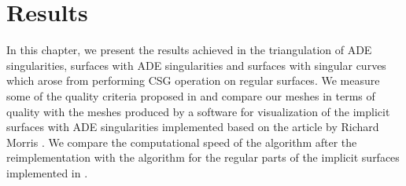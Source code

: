 \newcommand*{\MinNumberC}{0.5}%
\newcommand*{\MidNumberC}{0.75}%
\newcommand*{\MaxNumberC}{1.0}%
  
\newcommand{\ApplyGradientC}[1]{%
  \iftoggle{inTableHeader}{#1}{
    \ifdim #1 pt > \MidNumberC pt
        \pgfmathsetmacro{\PercentColor}{max(min(100.0*(#1 - \MidNumberC)/(\MaxNumberC-\MidNumberC),100.0),0.00)} %
        \colorbox{red!\PercentColor!yellow}{#1}
    \else
        \pgfmathsetmacro{\PercentColor}{max(min(100.0*(\MidNumberC - #1)/(\MidNumberC-\MinNumberC),100.0),0.00)} %
        \colorbox{green!\PercentColor!yellow}{#1}
    \fi
  }
  }

  
\newcommand*{\MinNumberD}{0.5}%
\newcommand*{\MidNumberD}{0.75}%
\newcommand*{\MaxNumberD}{1.0}%

\newcommand{\ApplyGradientD}[1]{%
  \iftoggle{inTableHeader}{#1}{
    \ifdim #1 pt > \MidNumberD pt
        \pgfmathsetmacro{\PercentColor}{max(min(100.0*(#1 - \MidNumberD)/(\MaxNumberD-\MidNumberD),100.0),0.00)} %
        \colorbox{red!\PercentColor!yellow}{#1}
    \else
        \pgfmathsetmacro{\PercentColor}{max(min(100.0*(\MidNumberD - #1)/(\MidNumberD-\MinNumberD),100.0),0.00)} %
        \colorbox{green!\PercentColor!yellow}{#1}
    \fi
  }
  }
  

\renewcommand{\arraystretch}{1}
\setlength{\fboxsep}{2mm} %
\setlength{\tabcolsep}{-4pt}








\chapter{Results}
\label{chap4}

In this chapter, we present the results achieved in the triangulation of
ADE singularities, surfaces with ADE singularities and surfaces with 
singular curves which arose from performing CSG operation on regular surfaces.
We measure some of the quality criteria proposed in \cite{korecova2021triangulation}
and compare our meshes in terms of quality with the meshes produced by a software 
for visualization of the implicit surfaces with ADE singularities implemented
based on the article by Richard Morris \cite{morris2003client}.
We compare the computational speed of the algorithm after the reimplementation
with the algorithm for the regular parts of the implicit surfaces 
implemented in \cite{korecova2021triangulation}.

